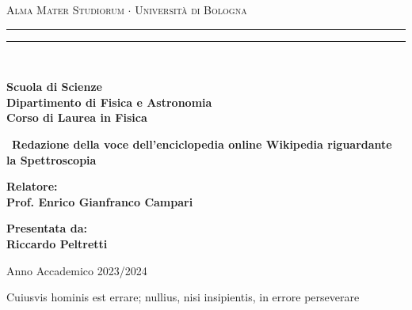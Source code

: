 \documentclass[12pt,a4paper]{report}
\begin{document}
\begin{titlepage}

\begin{center}
{{\Large{\textsc{Alma Mater Studiorum $\cdot$ Universit\`a di Bologna}}}} 
\rule[0.1cm]{15.8cm}{0.1mm}
\rule[0.5cm]{15.8cm}{0.6mm}
\\\vspace{3mm}

{\small{\bf Scuola di Scienze \\ 
Dipartimento di Fisica e Astronomia\\
Corso di Laurea in Fisica}}

\end{center}

\vspace{23mm}

\begin{center}\
{\LARGE{\bf Redazione della voce dell'enciclopedia online Wikipedia riguardante la Spettroscopia}}\\
\end{center}

\vspace{50mm} \par \noindent

\begin{minipage}[t]{0.47\textwidth}\raggedright 
{\large{\bf Relatore: \vspace{2mm}\\
Prof. Enrico Gianfranco Campari
}}
\end{minipage}
%
\hfill
%
\begin{minipage}[t]{0.47\textwidth}\raggedleft
{\large{\bf Presentata da:
\vspace{2mm}\\
Riccardo Peltretti}}
\end{minipage}

\vspace{40mm}

\begin{center}
Anno Accademico 2023/2024
\end{center}

\end{titlepage}

\vspace*{\fill}
\begin{flushright}
    Cuiusvis hominis est errare; nullius, nisi insipientis, in errore perseverare
\end{flushright}
\vspace*{\fill}\newpage
\end{document}
